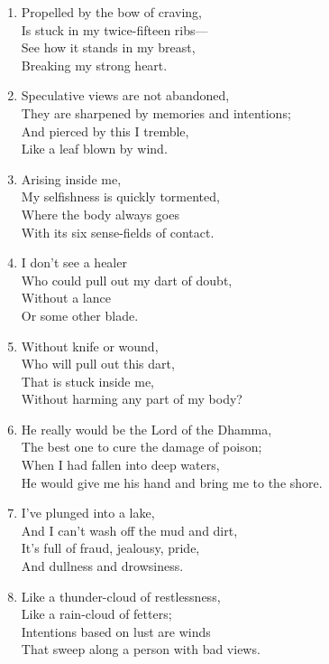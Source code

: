 \documentclass[10pt, openany]{book}
\begin{document}
\begin{enumerate}
\item Propelled by the bow of craving,\\
Is stuck in my twice-fifteen ribs—\\
See how it stands in my breast,\\
Breaking my strong heart.

\item Speculative views are not abandoned,\\
They are sharpened by memories and intentions;\\
And pierced by this I tremble,\\
Like a leaf blown by wind.

\item Arising inside me,\\
My selfishness is quickly tormented,\\
Where the body always goes\\
With its six sense-fields of contact.

\item I don’t see a healer\\
Who could pull out my dart of doubt,\\
Without a lance\\
Or some other blade.

\item Without knife or wound,\\
Who will pull out this dart,\\
That is stuck inside me,\\
Without harming any part of my body?

\item He really would be the Lord of the Dhamma,\\
The best one to cure the damage of poison;\\
When I had fallen into deep waters,\\
He would give me his hand and bring me to the shore.

\item I’ve plunged into a lake,\\
And I can’t wash off the mud and dirt,\\
It’s full of fraud, jealousy, pride,\\
And dullness and drowsiness.

\item Like a thunder-cloud of restlessness,\\
Like a rain-cloud of fetters;\\
Intentions based on lust are winds\\
That sweep along a person with bad views.


\end{enumerate}
\end{document}
